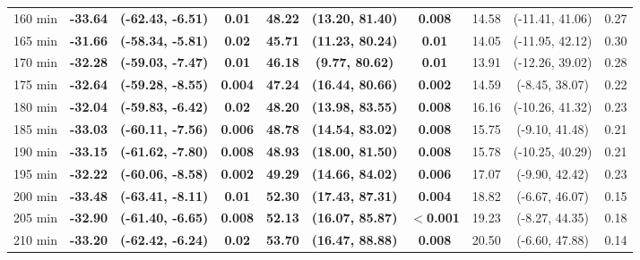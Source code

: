\begin{table}[ht]
{\begin{tabular}{lccccccccc}
160 min & \textbf{-33.64} & \textbf{(-62.43, -6.51)} & \textbf{0.01} & \textbf{48.22} & \textbf{(13.20, 81.40)} & \textbf{0.008} & 14.58 & (-11.41, 41.06) & 0.27 \\
165 min & \textbf{-31.66} & \textbf{(-58.34, -5.81)} & \textbf{0.02} & \textbf{45.71} & \textbf{(11.23, 80.24)} & \textbf{0.01} & 14.05 & (-11.95, 42.12) & 0.30 \\
170 min & \textbf{-32.28} & \textbf{(-59.03, -7.47)} & \textbf{0.01} & \textbf{46.18} & \textbf{(9.77, 80.62)} & \textbf{0.01} & 13.91 & (-12.26, 39.02) & 0.28 \\
175 min & \textbf{-32.64} & \textbf{(-59.28, -8.55)} & \textbf{0.004} & \textbf{47.24} & \textbf{(16.44, 80.66)} & \textbf{0.002} & 14.59 & (-8.45, 38.07) & 0.22 \\
180 min & \textbf{-32.04} & \textbf{(-59.83, -6.42)} & \textbf{0.02} & \textbf{48.20} & \textbf{(13.98, 83.55)} & \textbf{0.008} & 16.16 & (-10.26, 41.32) & 0.23 \\
185 min & \textbf{-33.03} & \textbf{(-60.11, -7.56)} & \textbf{0.006} & \textbf{48.78} & \textbf{(14.54, 83.02)} & \textbf{0.008} & 15.75 & (-9.10, 41.48) & 0.21 \\
190 min & \textbf{-33.15} & \textbf{(-61.62, -7.80)} & \textbf{0.008} & \textbf{48.93} & \textbf{(18.00, 81.50)} & \textbf{0.008} & 15.78 & (-10.25, 40.29) & 0.21 \\
195 min & \textbf{-32.22} & \textbf{(-60.06, -8.58)} & \textbf{0.002} & \textbf{49.29} & \textbf{(14.66, 84.02)} & \textbf{0.006} & 17.07 & (-9.90, 42.42) & 0.23 \\
200 min & \textbf{-33.48} & \textbf{(-63.41, -8.11)} & \textbf{0.01} & \textbf{52.30} & \textbf{(17.43, 87.31)} & \textbf{0.004} & 18.82 & (-6.67, 46.07) & 0.15 \\
205 min & \textbf{-32.90} & \textbf{(-61.40, -6.65)} & \textbf{0.008} & \textbf{52.13} & \textbf{(16.07, 85.87)} & \textbf{$<$0.001} & 19.23 & (-8.27, 44.35) & 0.18 \\
210 min & \textbf{-33.20} & \textbf{(-62.42, -6.24)} & \textbf{0.02} & \textbf{53.70} & \textbf{(16.47, 88.88)} & \textbf{0.008} & 20.50 & (-6.60, 47.88) & 0.14 \\
\bottomrule
\end{tabular}%
}
\end{table}
